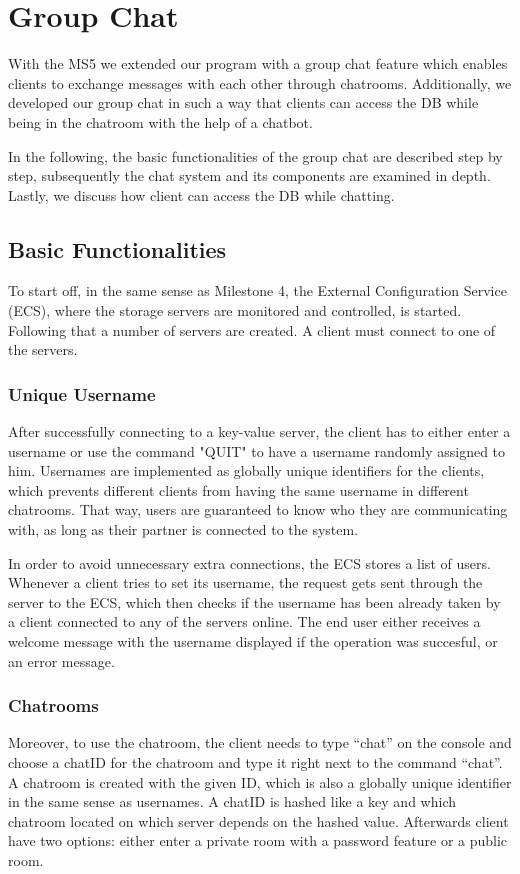 \section{Group Chat}
\label{sec:groupchat}
With the MS5 we extended our program with a group chat feature which enables clients to exchange messages with each other through chatrooms. Additionally, we developed our group chat in such a way that clients can access the DB while being in the chatroom with the help of a chatbot.
 
In the following, the basic functionalities of the group chat are described step by step, subsequently the chat system and its components are examined in depth. Lastly, we discuss how client can access the DB while chatting.

\subsection{Basic Functionalities}
\label{sec:groupchat_functionalities}
To start off, in the same sense as Milestone 4, the External Configuration Service (ECS), where the storage servers are monitored and controlled, is started. Following that a number of servers are created. A client must connect to one of the servers.

\subsubsection{Unique Username}
\label{sec:groupchat_funtionalities_uniqueusername}
After successfully connecting to a key-value server, the client has to either enter a username or use the command "QUIT" to have a username randomly assigned to him. Usernames are implemented as globally unique identifiers for the clients, which prevents different clients from having the same username in different chatrooms. That way, users are guaranteed to know who they are communicating with, as long as their partner is connected to the system. 

In order to avoid unnecessary extra connections, the ECS stores a list of users. Whenever a client tries to set its username, the request gets sent through the server to the ECS, which then checks if the username has been already taken by a client connected to any of the servers online. The end user either receives a welcome message with the username displayed if the operation was succesful, or an error message.
 
\subsubsection{Chatrooms}
\label{sec:groupchat_funtionalities_chatcommand}
Moreover, to use the chatroom, the client needs to type “chat” on the console and choose a chatID for the chatroom and type it right next to the command “chat”. A chatroom is created with the given ID, which is also a globally unique identifier in the same sense as usernames. A chatID is hashed like a key and which chatroom located on which server depends on the hashed value. Afterwards client have two options: either enter a private room with a password feature or a public room. 


